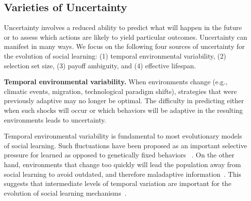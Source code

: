 \documentclass[letterpaper,11.5pt]{scrartcl}
\newcommand{\mt}[1]{{\textcolor{myorange} {({\tiny MT:} #1)}}}
\begin{document}

\subsection{Varieties of Uncertainty}

Uncertainty involves a reduced ability to predict what will happen in the future or to assess which actions are likely to yield particular outcomes. Uncertainty can manifest in many ways. We focus on the following four sources of uncertainty for the evolution of social learning: (1) temporal environmental variability, (2) selection set size, (3) payoff ambiguity, and (4) effective lifespan.

\textbf{Temporal environmental variability.} When environments change
(e.g., climatic events, migration, technological paradigm shifts),
strategies that were previously adaptive may no longer be optimal. The difficulty
in predicting either when such shocks will occur or which behaviors will be
adaptive in the resulting environments leads to uncertainty. 

Temporal environmental variability is fundamental to most evolutionary models of
social learning. Such fluctuations have been proposed as an important selective
pressure for learned as opposed to genetically fixed behaviors
~\cite{Richerson2000}. On the other hand, environments that change too quickly
will lead the population away from social learning to avoid outdated, 
and therefore maladaptive information~\cite{Feldman1996,
BoydRicherson1985}. This suggests that intermediate levels of temporal variation
are important for the evolution of social learning mechanisms~\cite{aoki2005}.
\end{document}
